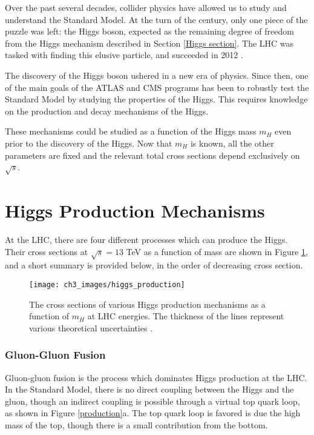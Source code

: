 \documentclass[10pt,a4paper]{book}
\begin{document}
Over the past several decades, collider physics have allowed us to study and understand the Standard Model. At the turn of the century, only one piece of the puzzle was left: the Higgs boson, expected as the remaining degree of freedom from the Higgs mechanism described in Section \ref{Higgs section}. The LHC was tasked with finding this elusive particle, and succeeded in 2012 \cite{ATLAS:2012yve, CMS:2012qbp}.

The discovery of the Higgs boson ushered in a new era of physics. Since then, one of the main goals of the ATLAS and CMS programs has been to robustly test the Standard Model by studying the properties of the Higgs. This requires knowledge on the production and decay mechanisms of the Higgs. 

These mechanisms could be studied as a function of the Higgs mass $m_{H}$ even prior to the discovery of the Higgs. Now that $m_{H}$ is known, all the other parameters are fixed and the relevant total cross sections depend exclusively on $\sqrt{s}$. 

\section{Higgs Production Mechanisms}

At the LHC, there are four different processes which can produce the Higgs. Their cross sections at $\sqrt{s} = 13$ TeV as a function of mass are shown in Figure \ref{Higgs production}, and a short summary is provided below, in the order of decreasing cross section.

\begin{figure}
\centering
\texttt{[image: ch3\_images/higgs\_production]}
\caption{The cross sections of various Higgs production mechanisms as a function of $m_H$ at LHC energies. The thickness of the lines represent various theoretical uncertainties \cite{LHCHiggsCrossSectionWorkingGroup:2016ypw}.}
\label{Higgs production}
\end{figure}

\subsubsection{Gluon-Gluon Fusion}
Gluon-gluon fusion is the process which dominates Higgs production at the LHC.
In the Standard Model, there is no direct coupling between the Higgs and the gluon, though an indirect coupling is possible through a virtual top quark loop, as shown in Figure \ref{production}a. The top quark loop is favored is due the high mass of the top, though there is a small contribution from the bottom.
\end{document}
